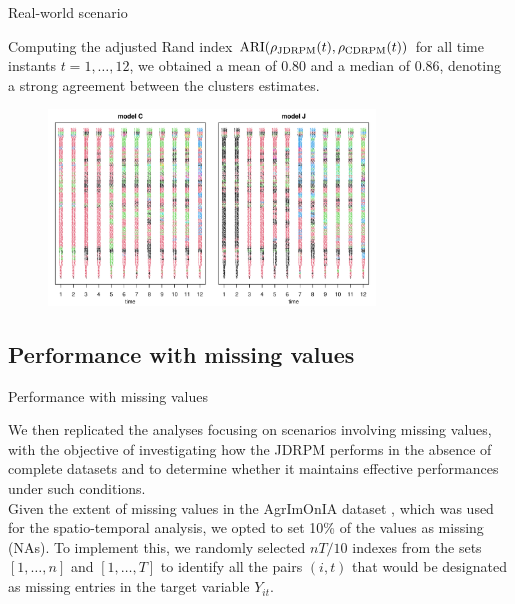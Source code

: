 \documentclass[
	11pt, %
 xcolor={dvipsnames,svgnames}
]{beamer}
\let\cite\citep
\begin{document}
\begin{frame}{Real-world scenario}

Computing the adjusted Rand index $\operatorname{ARI}(\rho_{\text{JDRPM}}(t),\rho_{\text{CDRPM}}(t))$ for all time instants $t=1,\ldots,12$, we obtained a \alert{mean of 0.80} and a \alert{median of 0.86}, denoting a strong agreement between the clusters estimates.
    \begin{figure}
        \centering
        \includegraphics[width=0.8\linewidth,height=5.2cm]{imgs/partizioni_nums.pdf}
        \label{fig:enter-label}
    \end{figure}
\end{frame}

\subsection{Performance with missing values}
\begin{frame}{Performance with missing values}

We then replicated the analyses focusing on scenarios involving missing values, with the objective of investigating how the JDRPM performs in the absence of complete datasets and to determine whether it maintains effective performances under such conditions.\\[6pt]
Given the extent of missing values in the AgrImOnIA dataset \cite{agrimonia}, which was used for the spatio-temporal analysis, we opted to set 10\% of the values as missing (NAs). To implement this, we randomly selected $nT/10$ indexes from the sets $[1,\ldots,n]$ and $[1,\ldots,T]$ to identify all the pairs $(i,t)$ that would be designated as missing entries in the target variable $Y_{it}$. 
\end{frame}
\end{document}
